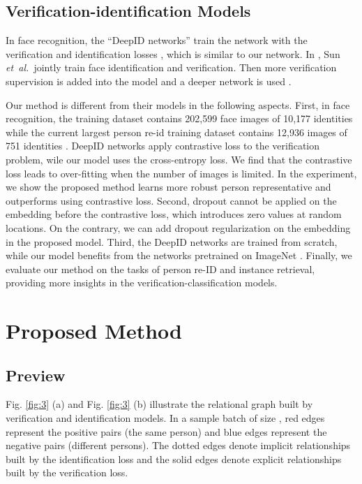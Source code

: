 \documentclass[journal]{IEEEtran}
\newcommand{\etal}{\mbox{\emph{et al.\ }}}
\begin{document}
\subsection{Verification-identification Models}
In face recognition, the ``DeepID networks'' train the network with the verification and identification losses \cite{sun2014deep,sun2015deeply,sun2015deepid3}, which is similar to our network. In \cite{sun2014deep}, Sun \etal jointly train face identification and verification. Then more verification supervision is added into the model \cite{sun2015deeply} and a deeper network is used \cite{sun2015deepid3}. 

Our method is different from their models in the following aspects. First, in face recognition, the training dataset contains 202,599 face images of 10,177 identities \cite{sun2014deep} while the current largest person re-id training dataset contains 12,936 images of 751 identities \cite{zheng2015scalable}. DeepID networks apply contrastive loss to the verification problem, wile our model uses the cross-entropy loss. We find that the contrastive loss leads to over-fitting when the number of images is limited. In the experiment, we show the proposed method learns more robust person representative and outperforms using contrastive loss. Second, dropout \cite{srivastava2014dropout} cannot be applied on the embedding before the contrastive loss, which introduces zero values at random locations. On the contrary, we can add dropout regularization on the embedding in the proposed model. Third, the DeepID networks are trained from scratch, while our model benefits from the networks pretrained on ImageNet \cite{russakovsky2015imagenet}. Finally, we evaluate our method on the tasks of person re-ID and instance retrieval, providing more insights in the verification-classification models. 



\section{Proposed Method} \label{method}

\subsection{Preview}
Fig. \ref{fig:3} (a) and Fig. \ref{fig:3} (b) illustrate the relational graph built by verification and identification models. In a sample batch of size , red edges represent the positive pairs (the same person) and blue edges represent the negative pairs (different persons). The dotted edges denote implicit relationships built by the identification loss and the solid edges denote explicit relationships built by the verification loss. 
\end{document}
